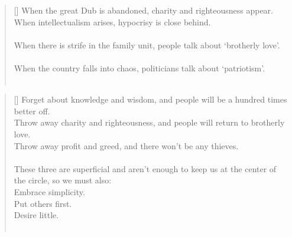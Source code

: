 \documentclass{article}
\begin{document}
\settowidth{\versewidth}{The Wizard leads byemptying people’s minds, filling their bellies, weakening their am- bitions, and making them become strong}
\begin{verse}[\versewidth]
When the great Dub is abandoned, charity and righteousness appear.\\ 
When intellectualism arises, hypocrisy is close behind.\\
\hfill\\
When there is strife in the family unit, people talk about `brotherly love'.\\
\hfill\\
When the country falls into chaos, politicians talk about `patriotism'.\\
\hfill\\
\end{verse}

\settowidth{\versewidth}{The Wizard leads byemptying people’s minds, filling their bellies, weakening their am- bitions, and making them become strong}
\begin{verse}[\versewidth]
Forget about knowledge and wisdom, and people will be a hundred times better off.\\
Throw away charity and righteousness, and people will return to brotherly love.\\
Throw away profit and greed, and there won't be any thieves.\\
\hfill\\
These three are superficial and aren't enough to keep us at the center of the circle, so we must also:\\

Embrace simplicity.\\
Put others first.\\
Desire little.\\
\hfill\\
\end{verse}
\end{document}
